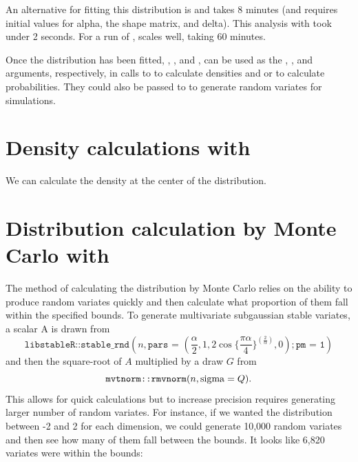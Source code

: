 An alternative for fitting this distribution is
 and takes 8 minutes (and requires initial values for alpha,
the shape matrix, and delta). This analysis with 
took under 2 seconds.  For a run of ,
 scales well, taking 60 minutes.


Once the distribution has been fitted, ,
, and , can be
used as the , , and  arguments,
respectively, in calls to  to calculate densities
and  or  to calculate
probabilities.  They could also be passed to  to
generate random variates for simulations.

\section{Density calculations with }

We can calculate the density at the center of the distribution.



\section{Distribution calculation by Monte Carlo with
  }

The method of calculating the distribution by Monte Carlo relies on the
ability to produce random variates quickly and then calculate what
proportion of them fall within the specified bounds.  To generate multivariate
subgaussian stable variates, a scalar A is drawn from
$$\texttt{libstableR::stable\_rnd}(n,
  \texttt{pars = } \left(\frac{\alpha}{2}, 1, 2 \cos \{ \frac{\pi \alpha}{4}
    \}^{\left(\frac{2}{\alpha}\right)}   , 0\right); \texttt{pm = 1})$$
  and then the square-root of $A$ multiplied by a draw $G$ from
$$\texttt{mvtnorm::rmvnorm}(n, {\rm sigma}=Q).$$
This allows for quick
calculations but to increase precision requires generating larger
number of random variates.  For instance, if we wanted the distribution
between -2 and 2 for each dimension, we could generate 10,000 random variates
and then see how many of them fall between the bounds.  It looks like
6,820 variates were within the bounds: 


